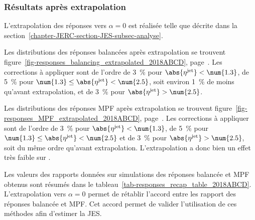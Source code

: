 \subsubsection{Résultats après extrapolation}\label{chapter-JERC-section-JES-subsec-results-subsubsec-after_extrap}
L'extrapolation des réponses vers $\alpha=0$ est réalisée telle que décrite dans la section~\ref{chapter-JERC-section-JES-subsec-analyse}.
\par Les distributions des réponses balancées après extrapolation se trouvent figure~\ref{fig-responses_balancing_extrapolated_2018ABCD}, page~\pageref{fig-responses_balancing_extrapolated_2018ABCD}.
Les corrections à appliquer sont de l'ordre
de \SI{3}{\%} pour $\abs{\eta^\text{jet}} < \num{1.3}$,
de \SI{5}{\%} pour $\num{1.3} \leq \abs{\eta^\text{jet}} < \num{2.5}$, soit environ \SI{1}{\%} de moins qu'avant extrapolation, et
de \SI{3}{\%} pour $\abs{\eta^\text{jet}} > \num{2.5}$.
\par Les distributions des réponses MPF après extrapolation se trouvent figure~\ref{fig-responses_MPF_extrapolated_2018ABCD}, page~\pageref{fig-responses_MPF_extrapolated_2018ABCD}.
Les corrections à appliquer sont de l'ordre
de \SI{3}{\%} pour $\abs{\eta^\text{jet}} < \num{1.3}$,
de \SI{5}{\%} pour $\num{1.3} \leq \abs{\eta^\text{jet}} < \num{2.5}$ et
de \SI{3}{\%} pour $\abs{\eta^\text{jet}} > \num{2.5}$,
soit du même ordre qu'avant extrapolation.
L'extrapolation a donc bien un effet très faible sur \RMPF.
\par Les valeurs des rapports données sur simulations des réponses balancée et MPF obtenus sont résumés dans le tableau~\ref{tab-responses_recap_table_2018ABCD}.
L'extrapolation vers $\alpha=0$ permet de rétablir l'accord entre les rapport des réponses balancée et MPF.
Cet accord permet de valider l'utilisation de ces méthodes afin d'estimer la JES.








